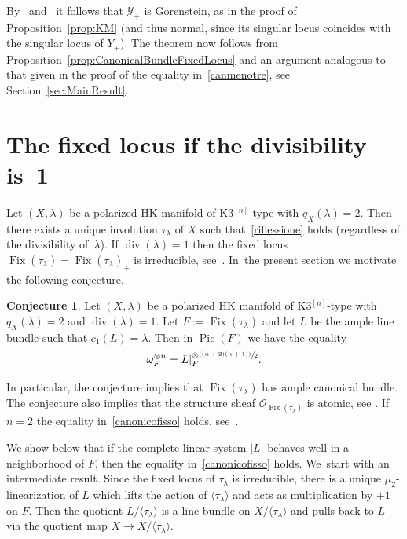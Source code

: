 \documentclass[JEP,XML,SOM,Unicode,published]{cedram}
\newcommand{\psfrac}[2]{\sfrac{(#1)}{#2}}
\newcommand{\HK}{\textup{HK}\xspace}
\newcommand\cO{\mathcal{O}}
\newcommand\cY{\mathcal{Y}}
\DeclareMathOperator{\divisore}{div}\let\div\divisore
\DeclareMathOperator{\Fix}{Fix}
\DeclareMathOperator{\Pic}{Pic}
\let\la\langle
\let\ra\rangle
\theoremstyle{definition}
\newtheorem{conj}[lemm]{Conjecture}
\def\citestacks#1{\cite[\href{https://stacks.math.columbia.edu/tag/#1}{Tag #1}]{stacks-project}}
\begin{document}
By~\citestacks{0C05} and~\citestacks{0C11} it follows that $\cY_+$ is Gorenstein, as in the proof of Proposition~\ref{prop:KM} (and thus normal, since its singular locus coincides with the singular locus of $\overline{Y}_+$).
The theorem now follows from Proposition~\ref{prop:CanonicalBundleFixedLocus} and an argument analogous to that given in the proof of the equality in~\eqref{canmenotre}, see Section~\ref{sec:MainResult}.

\section{The fixed locus if the divisibility is~1}\label{sec:poscomp}

Let $(X,\lambda)$ be a polarized \HK manifold of K3$^{[n]}$-type with $q_X(\lambda)=2$.
Then there exists a unique involution $\tau_{\lambda}$ of $X$ such that~\eqref{riflessione} holds (regardless of the divisibility of~$\lambda$). If $\divisore(\lambda)=1$ then the fixed locus $\Fix(\tau_{\lambda})=\Fix(\tau_{\lambda})_+$ is irreducible, see~\cite[Main\,Th.]{involutions1}. In~the present section we motivate the following conjecture.

\begin{conj}\label{conj:GeneralTypeDiv1}
Let $(X,\lambda)$ be a polarized \HK manifold of K3$^{[n]}$-type with \hbox{$q_X(\lambda)\!=\!2$}
and $\divisore(\lambda)=1$.
Let $F:=\Fix(\tau_{\lambda})$ and let $L$ be the ample line bundle such that $c_1(L)=\lambda$.
Then in $\Pic(F)$ we have the equality
\begin{equation}\label{canonicofisso}
\omega_F^{\otimes n}= L|_{F}^{\otimes \psfrac{(n+2)(n+1)}{2}}.
\end{equation}
\end{conj}

In particular, the conjecture implies that $\Fix(\tau_{\lambda})$ has ample canonical bundle. The conjecture also implies that the structure sheaf $\cO_{\Fix(\tau_{\lambda})}$ is atomic, see \cite[Th.\,1.8]{beck:Atomic}.
If $n=2$ the equality in~\eqref{canonicofisso} holds, see~\cite[Th.\,1.1(1)]{Kieran:numhilb2}.

We show below that if the complete linear system $|L|$ behaves well in a neighborhood of $F$, then the equality in~\eqref{canonicofisso} holds. We~start with an intermediate result.
Since the fixed locus of $\tau_{\lambda}$ is irreducible, there is a unique $\mu_2$-linearization of $L$ which lifts the action of $\la\tau_{\lambda}\ra$ and acts as multiplication by $+1$ on $F$. Then the quotient $L/\langle \tau_\lambda\rangle$ is a line bundle on $X/\la\tau_{\lambda}\ra$ and pulls back to $L$ via the quotient map $X\to X/\la\tau_{\lambda}\ra$.
\end{document}
